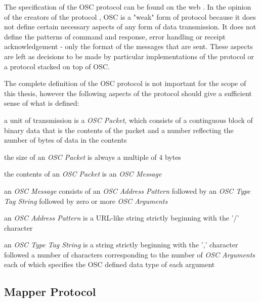The specification of the OSC protocol can be found on the web \cite{osc2011}. In the opinion of the creators of the protocol \cite{osc2009}, OSC is a "weak" form of protocol because it does not define certain necessary aspects of any form of data transmission. It does not define the patterns of command and response, error handling or receipt acknowledgement - only the format of the messages that are sent. These aspects are left as decisions to be made by particular implementations of the protocol or a protocol stacked on top of OSC.

The complete definition of the OSC protocol is not important for the scope of this thesis, however the following aspects of the protocol should give a sufficient sense of what is defined:

\begin{description}
\item a unit of transmission is a \emph{OSC Packet}, which consists of a continguous block of binary data that is the contents of the packet and a number reflecting the number of bytes of data in the contents
\item the size of an \emph{OSC Packet} is always a multiple of 4 bytes
\item the contents of an \emph{OSC Packet} is an \emph{OSC Message}
\item an \emph{OSC Message} consists of an \emph{OSC Address Pattern} followed by an \emph{OSC Type Tag String} followed by zero or more \emph{OSC Arguments}
\item an \emph{OSC Address Pattern} is a URL-like string strictly beginning with the '/' character
\item an \emph{OSC Type Tag String} is a string strictly beginning with the ',' character followed a number of characters corresponding to the number of \emph{OSC Arguments} each of which specifies the OSC defined data type of each argument
\end{description}

\subsection{Mapper Protocol}

